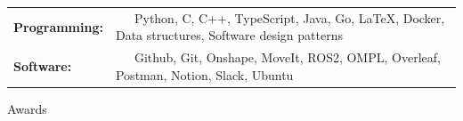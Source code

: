 \documentclass{resume}
\begin{document}
\begin{tabular}{ll}
    \textbf{Programming:} & ~~~Python, C, C++, TypeScript, Java, Go, \LaTeX, Docker, Data structures, Software design patterns \\
    \textbf{Software:} & ~~~Github, Git, Onshape, MoveIt, ROS2, OMPL, Overleaf, Postman, Notion, Slack, Ubuntu \\
\end{tabular}

\begin{experienceSection}{Awards}
    \projectItem[
    title=Hispanic Scholarship Fund - Scholar,
    duration={June 2023, June 2024, June 2025}
    ]
    \projectItem[
    title=Rice President’s Honor Roll,
    duration={Fall 2023, Fall 2024}
    ]
    \projectItem[
    title=Eagle Scout Award,
    duration=October 2022
    ]
\end{experienceSection}
\end{document}
